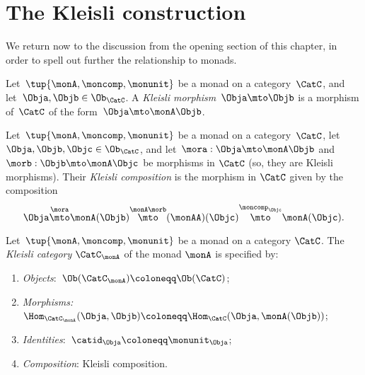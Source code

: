 
\section{The Kleisli construction}
\label{sec:Kleisli}

We return now to the discussion from the opening section of this chapter, in order to spell out further the relationship to monads.

\begin{ctdefinition}
    \label{def:kleislimor}
    Let~$\tup{\monA, \moncomp, \monunit}$ be a monad on a category~$\CatC$, and let~$\Obja, \Objb \in \Ob_\CatC$.
    A
    \emph{Kleisli morphism}~$\Obja \mto \Objb$ is a morphism of~$\CatC$ of the form~$\Obja \mto \monA \Objb$.
\end{ctdefinition}

\begin{ctdefinition}
    \label{def:kleislicomp}
    Let~$\tup{\monA, \moncomp, \monunit}$ be a monad on a category~$\CatC$, let~$\Obja, \Objb, \Objc \in \Ob_\CatC$,  and let~$\mora : \Obja \mto \monA \Objb$ and $\morb : \Objb \mto \monA \Objc$ be morphisms in $\CatC$ (so, they are Kleisli morphisms).
    Their \emph{Kleisli composition} is the morphism in $\CatC$ given by the composition
    \begin{equation}
        \Obja \overset{\mora}{\mto} \monA(\Objb) \overset{\monA \morb}{\mto} (\monAA)(\Objc) \overset{\moncomp_\Objc}{\mto} \monA(\Objc).
    \end{equation}
\end{ctdefinition}

\begin{ctdefinition}
    \label{def:kleislicat}
    Let~$\tup{\monA, \moncomp, \monunit}$ be a monad on a category $\CatC$.
    The \emph{Kleisli category} $\CatC_\monA$ of the monad $\monA$ is specified by:
    \begin{enumerate}
        \item \emph{Objects}:~$\Ob(\CatC_\monA) \coloneqq \Ob(\CatC)$;
        \item \emph{Morphisms:}~$\Hom_{\CatC_\monA}(\Obja, \Objb) \coloneqq \Hom_{\CatC}(\Obja, \monA(\Objb))$;
        \item \emph{Identities}:~$\catid_\Obja \coloneqq \monunit_\Obja$;
        \item \emph{Composition}: Kleisli composition.
    \end{enumerate}
\end{ctdefinition}

